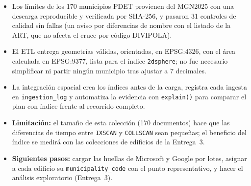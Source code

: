 \documentclass[12pt, letterpaper]{article}
\begin{document}
\begin{itemize}
  \item Los límites de los 170 municipios PDET provienen del MGN2025 con una descarga reproducible y verificada por SHA-256, y pasaron 31 controles de calidad sin fallas (un aviso por diferencias de nombre con el listado de la ART, que no afecta el cruce por código DIVIPOLA).
  \item El ETL entrega geometrías válidas, orientadas, en EPSG:4326, con el área calculada en EPSG:9377, lista para el índice \texttt{2dsphere}; no fue necesario simplificar ni partir ningún municipio tras ajustar a 7 decimales.
  \item La integración espacial crea los índices antes de la carga, registra cada ingesta en \texttt{ingestion\_log} y automatiza la evidencia con \texttt{explain()} para comparar el plan con índice frente al recorrido completo.
  \item \textbf{Limitación:} el tamaño de esta colección (170 documentos) hace que las diferencias de tiempo entre \texttt{IXSCAN} y \texttt{COLLSCAN} sean pequeñas; el beneficio del índice se medirá con las colecciones de edificios de la Entrega~3.
  \item \textbf{Siguientes pasos:} cargar las huellas de Microsoft y Google por lotes, asignar a cada edificio su \texttt{municipality\_code} con el punto representativo, y hacer el análisis exploratorio (Entrega~3).
\end{itemize}
\end{document}
